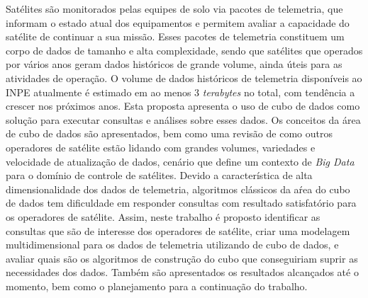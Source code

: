 
\begin{resumo}

\hypertarget{estilo:resumo}{} %

Satélites são monitorados pelas equipes de solo via pacotes de telemetria, que informam o estado atual dos equipamentos e permitem avaliar a capacidade do satélite de continuar a sua missão.
Esses pacotes de telemetria constituem um corpo de dados de tamanho e alta complexidade, sendo que satélites que operados por vários anos geram dados históricos de grande volume, ainda úteis para as atividades de operação.
O volume de dados históricos de telemetria disponíveis ao INPE atualmente é estimado em ao menos 3 \textit{terabytes} no total, com tendência a crescer nos próximos anos.
Esta proposta apresenta o uso de cubo de dados como solução para executar consultas e análises sobre esses dados.
Os conceitos da área de cubo de dados são apresentados, bem como uma revisão de como outros operadores de satélite estão lidando com grandes volumes, variedades e velocidade de atualização de dados, cenário que define um contexto de \textit{Big Data} para o domínio de controle de satélites.
Devido a característica de alta dimensionalidade dos dados de telemetria, algoritmos clássicos da aŕea do cubo de dados tem dificuldade em responder consultas com resultado satisfatório para os operadores de satélite.
Assim, neste trabalho é proposto identificar as consultas que são de interesse dos operadores de satélite, criar uma modelagem multidimensional para os dados de telemetria utilizando de cubo de dados, e avaliar quais são os algoritmos de construção do cubo que conseguiriam suprir as necessidades dos dados.
Também são apresentados os resultados alcançados até o momento, bem como o planejamento para a continuação do trabalho.


\end{resumo}
